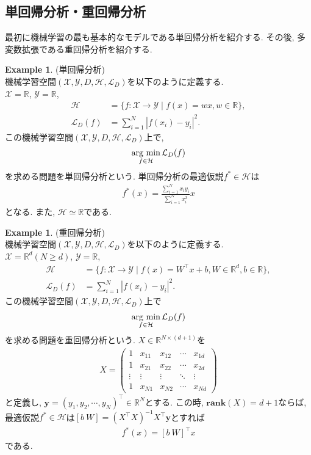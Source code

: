 \documentclass[11pt, a4paper, dvipdfmx]{jsarticle}
\theoremstyle{definition}
\newtheorem{Example+}[Axiom+]{Example}
\newcommand{\R}{\mathbb{R}}
\newcommand{\X}{\mathcal{X}}
\newcommand{\Y}{\mathcal{Y}}
\newcommand{\Hil}{\mathcal{H}}
\newcommand{\Loss}{\mathcal{L}_{D}}
\newcommand{\MLsp}{(\X, \Y, D, \Hil, \Loss)}
\newcommand{\argmin}{\mathop{\rm arg~min}\limits}
\begin{document}
\subsection{単回帰分析・重回帰分析}
最初に機械学習の最も基本的なモデルである単回帰分析を紹介する. その後, 
多変数拡張である重回帰分析を紹介する.
\begin{Example+}(単回帰分析)\\
    機械学習空間$\MLsp$を以下のように定義する.\\
    $\X = \R$, $\Y = \R$, 
    \begin{align*}
        \Hil &= \{f:\X\to\Y\mid f(x) = wx, w\in\R\},\\
        \Loss(f) &= \sum_{i = 1}^{N}|f(x_i) - y_i|^2.
    \end{align*}
    この機械学習空間$\MLsp$上で,
    \begin{align*}
        \argmin_{f\in\Hil}\Loss(f)
    \end{align*}
    を求める問題を単回帰分析という. 単回帰分析の最適仮説$f^{*}\in\Hil$は
    \begin{align*}
        f^{*}(x) = \frac{\sum_{i = 1}^{N}x_{i}y_{i}}{\sum_{i = 1}^{N}x_{i}^2}x
    \end{align*}
    となる. また, $\Hil\simeq\R$である.
\end{Example+}
\begin{Example+}(重回帰分析)\\
    機械学習空間$\MLsp$を以下のように定義する.\\
    $\X = \R^d(N\geq d)$, $\Y = \R$, 
    \begin{align*}
        \Hil &= \{f:\X\to\Y\mid f(x) = W^{\top}x + b, W\in\R^{d}, b\in\R\},\\
        \Loss(f) &= \sum_{i = 1}^{N}|f(x_i) - y_i|^2.
    \end{align*}
    この機械学習空間$\MLsp$上で
    \begin{align*}
        \argmin_{f\in\Hil}\Loss(f)
    \end{align*}
    を求める問題を重回帰分析という. $X\in\R^{N\times(d + 1)}$を
    \begin{align*}
        X = \begin{pmatrix}
            1 & x_{11} & x_{12} & \cdots & x_{1d}\\
            1 & x_{21} & x_{22} & \cdots & x_{2d}\\
            \vdots & \vdots & \vdots & \ddots & \vdots\\
            1 & x_{N1} & x_{N2} & \cdots & x_{Nd}
        \end{pmatrix}
    \end{align*}
    と定義し, $\mathbf{y} = (y_{1}, y_{2}, \cdots, y_{N})^{\top}\in\R^{N}$とする. この時, $\mathbf{rank}(X) = d + 1$ならば, 
    最適仮説$f^*\in\Hil$は$[b~W] = (X^\top X)^{-1}X^\top\mathbf{y}$とすれば
    \begin{align*}
        f^{*}(x) = [b~W]^{\top}x
    \end{align*}
    である.
\end{Example+}
\end{document}
